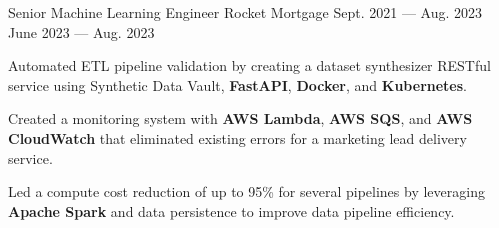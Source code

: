 
\vspace{-0.2cm}
\begin{cventries}
  \cventry
    {Senior Machine Learning Engineer} %
    {Rocket Mortgage} %
    {Sept. 2021 --- Aug. 2023} %
    {June 2023 --- Aug. 2023} %
    {
      \vspace{-0.1cm}
      \begin{cvitems} %
        \item Automated ETL pipeline validation by creating a dataset synthesizer RESTful service using Synthetic Data Vault, \textbf{FastAPI}, \textbf{Docker}, and \textbf{Kubernetes}.
        \item Created a monitoring system with \textbf{AWS Lambda}, \textbf{AWS SQS}, and \textbf{AWS CloudWatch} that eliminated existing errors for a marketing lead delivery service.
        \item Led a compute cost reduction of up to 95\% for several pipelines by leveraging \textbf{Apache Spark} and data persistence to improve data pipeline efficiency.
      \end{cvitems}
    }
  \vspace{-.2cm}


\end{cventries}
